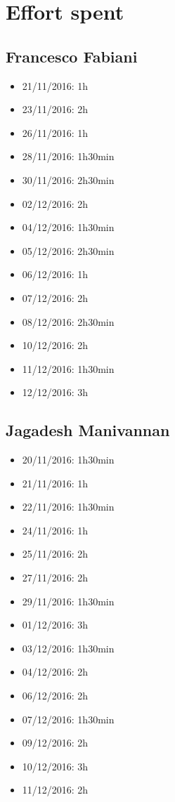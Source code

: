 \chapter{Effort spent}

\section{Francesco Fabiani}
\begin{itemize}
	\item 21/11/2016: 1h
	\item 23/11/2016: 2h
	\item 26/11/2016: 1h
	\item 28/11/2016: 1h30min
	\item 30/11/2016: 2h30min
	\item 02/12/2016: 2h
	\item 04/12/2016: 1h30min
	\item 05/12/2016: 2h30min
	\item 06/12/2016: 1h
	\item 07/12/2016: 2h
	\item 08/12/2016: 2h30min
	\item 10/12/2016: 2h
	\item 11/12/2016: 1h30min
	\item 12/12/2016: 3h
\end{itemize}

\section{Jagadesh Manivannan}
\begin{itemize}
	\item 20/11/2016: 1h30min
	\item 21/11/2016: 1h
	\item 22/11/2016: 1h30min
	\item 24/11/2016: 1h
	\item 25/11/2016: 2h
	\item 27/11/2016: 2h
	\item 29/11/2016: 1h30min
	\item 01/12/2016: 3h
	\item 03/12/2016: 1h30min
	\item 04/12/2016: 2h
	\item 06/12/2016: 2h
	\item 07/12/2016: 1h30min
	\item 09/12/2016: 2h
	\item 10/12/2016: 3h
	\item 11/12/2016: 2h
\end{itemize}

